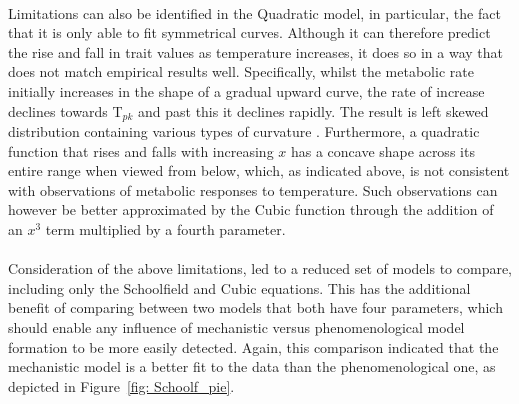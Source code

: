 \documentclass[11pt]{article}
\begin{document}
\\
Limitations can also be identified in the Quadratic model, in particular, the fact that it is only able to fit symmetrical curves. Although it can therefore predict the rise and fall in trait values as temperature increases, it does so in a way that does not match empirical results well. Specifically, whilst the metabolic rate initially increases in the shape of a gradual upward curve, the rate of increase declines towards T\begin{math}_{pk}\end{math} and past this it declines rapidly. The result is left skewed distribution containing various types of curvature \cite{knies2010erroneous}. Furthermore, a quadratic function that rises and falls with increasing \begin{math}x\end{math} has a concave shape across its entire range when viewed from below, which, as indicated above, is not consistent with observations of metabolic responses to temperature. Such observations can however be better approximated by the Cubic function through the addition of an \begin{math}x^3\end{math} term multiplied by a fourth parameter.
\\
\\
Consideration of the above limitations, led to a reduced set of models to compare, including only the Schoolfield and Cubic equations. This has the additional benefit of comparing between two models that both have four parameters, which should enable any influence of mechanistic versus phenomenological model formation to be more easily detected. Again, this comparison indicated that the mechanistic model is a better fit to the data than the phenomenological one, as depicted in Figure~\ref{fig: Schoolf_pie}. 
\\
\\
\end{document}
